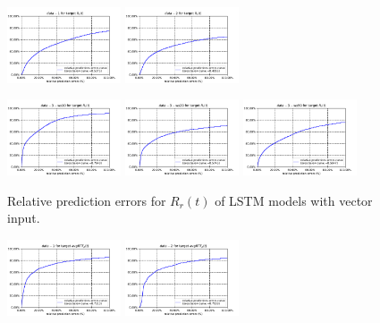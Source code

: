 \documentclass[sigconf]{acmart}
\begin{document}
	\begin{figure} 	
		\includegraphics[width=0.3\textwidth]{fig4/data-1-task-1-7030-lstm.pdf}
		\includegraphics[width=0.3\textwidth]{fig4/data-2-task-1-7030-lstm.pdf}
	\end{figure} 
	\begin{figure} 
		\includegraphics[width=0.3\textwidth]{fig4/data-3-ws10-task-1-7030-lstm.pdf}
		\includegraphics[width=0.3\textwidth]{fig4/data-3-ws20-task-1-7030-lstm.pdf}
		\includegraphics[width=0.3\textwidth]{fig4/data-3-ws50-task-1-7030-lstm.pdf}
		\caption{Relative prediction errors for $R_r(t)$ of LSTM models with vector input.}
		\label{fig:lstm-task1-vector}
	\end{figure}
	\begin{figure} 	
	\includegraphics[width=0.3\textwidth]{fig4/data-1-task-3-7030-lstm.pdf}
	\includegraphics[width=0.3\textwidth]{fig4/data-2-task-3-7030-lstm.pdf}
	\end{figure} 
\end{document}
